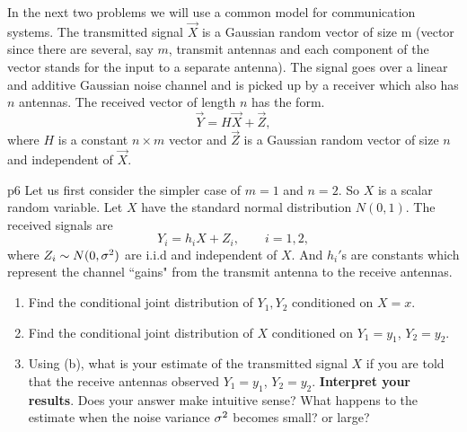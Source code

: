 \documentclass[a4paper, 11pt]{article}
\begin{document}
\parinf\vspace*{1cm}

In the next two problems we will use a common model for communication systems.
The transmitted signal $\vec{X}$ is a Gaussian random vector of size m (vector since there
are several, say $m$, transmit antennas and each component of the vector stands for the
input to a separate antenna). The signal goes over a linear and additive Gaussian noise
channel and is picked up by a receiver which also has $n$ antennas. The received vector
of length $n$ has the form.\begin{equation}
	\vec{Y}=H\vec{X}+\vec{Z},\label{eq}
\end{equation}where $H$ is a constant $n\times m$ vector and $\vec{Z}$ is a Gaussian random vector of size $n$ and independent of $\vec{X}$.

\begin{problem}{%
	}{p6%
	}
Let us first consider the simpler case of $m=1$ and $n=2$. So $X$ is a scalar random variable. Let $X$ have the standard normal distribution $N(0,1)$. The received signals are $$Y_i=h_iX+Z_i,\qquad i=1,2,$$where $Z_i\sim N(0,\sigma^2)$ are i.i.d and independent of $X$. And $h_i'$s are constants which represent the channel ``gains" from the transmit antenna to the receive antennas.\begin{enumerate}[label=(\alph*)]
	\item Find the conditional joint distribution of $Y_1,Y_2$ conditioned on $X=x$.
	\item Find the conditional joint distribution of $X$ conditioned on $Y_1=y_1$, $Y_2=y_2$.
	\item Using (b), what is your estimate of the transmitted signal $X$ if you are told that the receive antennas observed $Y_1=y_1$, $Y_2=y_2$. \textbf{Interpret your results}. Does your answer make intuitive sense? What happens to the estimate when the noise variance $\sigma^2$ becomes small? or large?
\end{enumerate}
\end{problem}
\solve{
}

\end{document}
